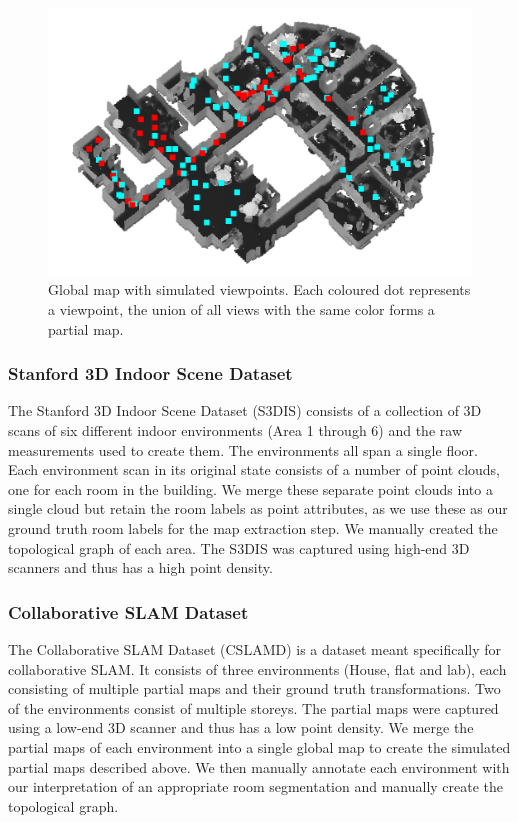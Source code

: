 \pagebreak

\begin{figure}[h]
    \centering
    \includegraphics*[width=.6\textwidth]{./fig/simulated_views.png}
    \caption{Global map with simulated viewpoints. Each coloured dot represents a viewpoint, the union of all views with the same color forms a partial map.}
    \label{fig:simulated}
\end{figure}

\subsubsection{Stanford 3D Indoor Scene Dataset}
The Stanford 3D Indoor Scene Dataset (S3DIS) consists of a collection of 3D scans of six different indoor environments (Area 1 through 6) and the raw measurements used to create them. The environments all span a single floor. Each environment scan in its original state consists of a number of point clouds, one for each room in the building. We merge these separate point clouds into a single cloud but retain the room labels as point attributes, as we use these as our ground truth room labels for the map extraction step. We manually created the topological graph of each area. The S3DIS was captured using high-end 3D scanners and thus has a high point density.

\subsubsection{Collaborative SLAM Dataset}
The Collaborative SLAM Dataset (CSLAMD) is a dataset meant specifically for collaborative SLAM. It consists of three environments (House, flat and lab), each consisting of multiple partial maps and their ground truth transformations. Two of the environments consist of multiple storeys. The partial maps were captured using a low-end 3D scanner and thus has a low point density. We merge the partial maps of each environment into a single global map to create the simulated partial maps described above. We then manually annotate each environment with our interpretation of an appropriate room segmentation and manually create the topological graph.

